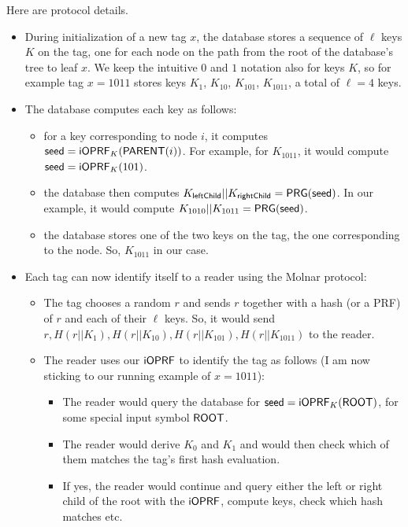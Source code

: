 Here are protocol details.
\begin{itemize}

\item During initialization of a new tag $x$, the database stores a
  sequence of $\ell$ keys $K$ on the tag, one for each node on the path from
  the root of the database's tree to leaf $x$. We keep the intuitive $0$
  and $1$ notation also for keys $K$, so for example tag $x = 1011$ stores
  keys $K_1$, $K_{10}$, $K_{101}$, $K_{1011}$, a total of $\ell=4$ keys.

\item The database computes each key as follows:  
\begin{itemize}
\item for a key corresponding to node $i$, it computes $\mathsf{seed} =
  \mathsf{i}\mathsf{OPRF}_K(\mathsf{PARENT}(i))$. For example, for $K_{1011}$, it would
  compute $\mathsf{seed} = \mathsf{i}\mathsf{OPRF}_K(101)$.

\item the database then computes
  $K_{\mathsf{leftChild}}||K_{\mathsf{rightChild}} = \mathsf{PRG}(\mathsf{seed})$. In
  our example, it would compute $K_{1010}||K_{1011} = \mathsf{PRG}(\mathsf{seed})$.

\item the database stores one of the two keys on the tag, the one corresponding to the node. So, $K_{1011}$ in our case.
\end{itemize}

\item Each tag can now identify itself to a reader using the Molnar protocol:

  \begin{itemize}
\item The tag chooses a random $r$ and sends $r$ together with a hash (or a PRF) of $r$ and each of their $\ell$ keys. So, it would send $r, H(r||K_1), H(r||K_{10}), H(r||K_{101}), H(r||K_{1011})$ to the reader.

\item The reader uses our $\mathsf{i}\mathsf{OPRF}$ to identify the tag as follows (I am now sticking to our running example of $x=1011$):
  \begin{itemize}
    
\item The reader would query the database for $\mathsf{seed} =
  \mathsf{i}\mathsf{OPRF}_K(\mathsf{ROOT})$, for some special input symbol $\mathsf{ROOT}$.

\item The reader would derive $K_0$ and $K_1$ and would then check which of them matches the tag's first hash evaluation. 

\item If yes, the reader would continue and query either the left or right child of the root with the $\mathsf{i}\mathsf{OPRF}$, compute keys, check which hash matches etc.
\end{itemize}
  \end{itemize}
\end{itemize}

